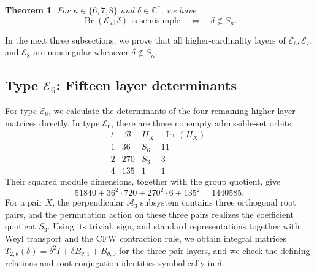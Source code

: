 \documentclass[11pt,a4paper]{amsart}
\newcommand{\C}{\mathbb C}\newcommand{\Q}{\mathbb Q}\newcommand{\Z}{\mathbb Z}
\newcommand{\Br}{\operatorname{Br}}\newcommand{\Irr}{\operatorname{Irr}}
\newtheorem{theorem}{Theorem}[section]
\theoremstyle{uprightdefinition}
\theoremstyle{remark}\newtheorem{remark}[theorem]{Remark}
\begin{document}
\begin{theorem}\label{thm:app-exceptional}
For $\kappa\in\{6,7,8\}$ and $\delta\in\C^*$, we have
\[
 \Br(\mathscr{E}_{\kappa};\delta)\text{ is semisimple}
 \quad\Longleftrightarrow\quad \delta\notin S_{\kappa}.
\]
\end{theorem}
In the next three subsections, we prove that all higher-cardinality layers of $\mathscr{E}_6,\mathscr{E}_7,$ and $\mathscr{E}_8$ are nonsingular whenever $\delta\notin S_\kappa$.

\subsection{Type \texorpdfstring{$\mathscr{E}_6$}{E6}: Fifteen layer determinants}
For type $\mathscr{E}_6$, we calculate the determinants of the four remaining higher-layer matrices directly.
In type $\mathscr{E}_6$, there are three nonempty admissible-set orbits:
\[
\begin{array}{c|r|c|r}
 t&|\mathcal B|&H_X&|\Irr(H_X)|\\\hline
 1&36&S_6&11\\
 2&270&S_3&3\\
 4&135&1&1
\end{array}
\]
Their squared module dimensions, together with the group quotient, give
\[
 51840+36^2\cdot720+270^2\cdot6+135^2=1440585.
\]
For a pair $X$, the perpendicular $\mathscr{A}_3$ subsystem contains three orthogonal root
pairs, and the permutation action on these three pairs realizes the
coefficient quotient $S_3$. Using its trivial, sign, and standard
representations together with Weyl transport and the CFW contraction rule, we obtain integral matrices
$T_{2,\theta}(\delta)=\delta^2I+\delta B_{\theta,1}+B_{\theta,0}$ for the three pair layers, and we check the defining relations and root-conjugation identities
symbolically in $\delta$.
\end{document}
